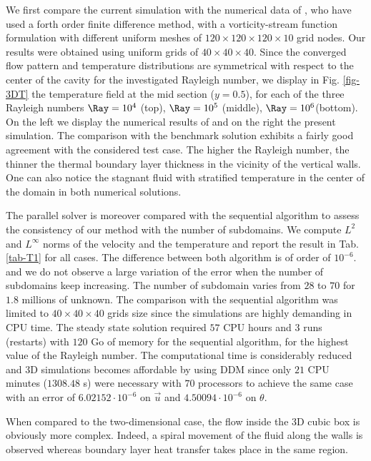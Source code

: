 We first compare the current simulation with the numerical data of \cite{Wakashima-2004}, who have used a forth order finite difference method, with a vorticity-stream function formulation with different uniform meshes of  $120 \times 120 \times 120 \times 10$ grid nodes.
Our results were obtained using uniform grids of $ 40 \times 40 \times 40$.
Since the converged flow pattern and temperature distributions are symmetrical with respect to the center of the cavity for the investigated Rayleigh number,
we display in 
Fig. \ref{fig-3DT} the temperature field at the mid section ($y = 0.5$), for each of the three Rayleigh numbers $\Ray = 10^4$ (top), $\Ray = 10^5$ (middle), $\Ray = 10^6$(bottom).  
On the left we display the numerical results of \cite{Wakashima-2004} and on the right the present simulation.
The comparison with the benchmark solution exhibits a fairly good agreement with the considered test case.
The higher the Rayleigh number, the thinner the thermal boundary layer thickness in the vicinity of the vertical walls.
One can also notice the stagnant fluid with stratified temperature in the center of the domain in both numerical solutions.



The parallel solver is moreover compared with the sequential algorithm to assess the consistency of our method with the number of subdomains.
We compute $L^2$ and $L^\infty$ norms of the velocity and the temperature and report the result in Tab. \ref{tab-T1} for all cases.
The difference between both algorithm is of order of $10^{-6}$.
and we do not observe a large variation of the error when the number of subdomains keep increasing.
The number of subdomain varies from $28$ to $70$ for $1.8$ millions of unknown.
The comparison with the sequential algorithm was limited to $40 \times 40 \times 40$ grids size since the simulations are highly demanding in CPU time.
The steady state solution required $57$ CPU hours and $3$ runs (restarts) with $120$ Go of memory for the sequential algorithm, for the highest value of the Rayleigh number. 
The computational time is considerably reduced and 3D simulations becomes affordable by using DDM since only $21$ CPU minutes  ($1308.48$ s) were necessary with $70$ processors to achieve the same case with an error of $6.02152 \cdot 10^{-6}$ on $\vec u$ and $ 4.50094 \cdot 10^{-6} $ on $\theta$.

When compared to the two-dimensional case, the flow inside the 3D cubic box is obviously more complex.
Indeed, a spiral movement of the fluid along the walls is observed whereas boundary layer heat transfer takes place in the same region.

